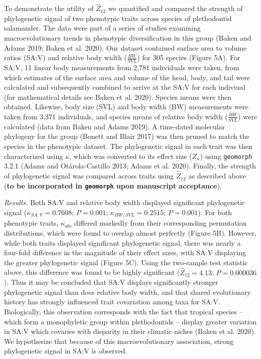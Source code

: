 \documentclass[]{article}
\begin{document}
To demonstrate the utility of \(\hat{Z}_{12}\) we quantified and
compared the strength of phylogenetic signal of two phenotypic traits
across species of plethodontid salamander. The data were part of a
series of studies examining macroevolutionary trends in phenotypic
diversification in this group (Baken and Adams 2019; Baken et al. 2020).
Our dataset contained surface area to volume ratios (SA:V) and relative
body width (\(\frac{BW}{SVL}\)) for 305 species (Figure 5A). For SA:V,
11 linear body measurements from 2,781 individuals were taken, from
which estimates of the surface area and volume of the head, body, and
tail were calculated and subsequently combined to arrive at the SA:V for
each indiviual (for mathematical details see Baken et al. 2020). Species
means were then obtained. Likewise, body size (SVL) and body width (BW)
measurements were taken from 3,371 individuals, and species means of
relative body width (\(\frac{BW}{SVL}\)) were calculated (data from
Baken and Adams 2019). A time-dated molecular phylogeny for the group
(Bonett and Blair 2017) was then pruned to match the species in the
phenotypic dataset. The phylogenetic signal in each trait was then
characterized using \(\kappa\), which was converted to its effect size
(\(Z_\kappa\)) using \texttt{geomorph} 3.2.1 (Adams and Otárola-Castillo
2013; Adams et al. 2020). Finally, the strength of phylogenetic signal
was compared across traits using \(\hat{Z}_{12}\) as described above
(\textbf{to be incorporated in \texttt{geomorph} upon manuscript
acceptance}). \hfill\break

\emph{Results.} Both SA:V and relative body width displayed significant
phylogenetic signal (\(\kappa_{SA:V}=0.7608\); \(P=0.001\);
\(\kappa_{BW/SVL}=0.2515\); \(P=0.001\)). For both phenotypic traits,
\(\kappa_{obs}\) differed markedly from their corresponding permutation
distributions, which were found to overlap almost perfectly (Figure 5B).
However, while both traits displayed significant phylogenetic signal,
there was nearly a four-fold difference in the magnitude of their effect
sizes, with SA:V displaying the greater phylogenetic signal (Figure 5C).
Using the two-sample test statistic above, this difference was found to
be highly significant (\(\hat{Z}_{12}=4.13\); \(P=0.000036\)). Thus it
may be concluded that SA:V displays significantly stronger phylogenetic
signal than does relative body width, and that shared evolutionary
history has strongly influenced trait covariation among taxa for SA:V.
Biologically, this observation corresponds with the fact that tropical
species -- which form a monophyletic group within plethodontids --
display greater variation in SA:V which covaries with disparity in their
climatic niches (Baken et al. 2020). We hypothesize that because of this
macroevolutionary association, strong phylogenetic signal in SA:V is
observed.
\end{document}
